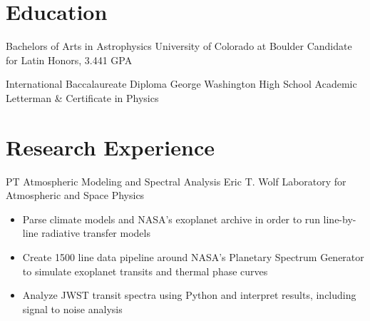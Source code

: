 \documentclass[11pt]{article} %
\begin{document}
\pagebreak[3]
\section{Education} 





     
    {}
    {Bachelors of Arts in Astrophysics} %
    {University of Colorado at Boulder} %
    {Candidate for Latin Honors, 3.441 GPA} %
    {}
    
    
    {}
    {International Baccalaureate Diploma} %
    {George Washington High School} %
    {Academic Letterman \& Certificate in Physics} %
    {}


\pagebreak[3]
\section{Research Experience}

{PT} %
{Atmospheric Modeling and Spectral Analysis} %
{Eric T. Wolf} %
{Laboratory for Atmospheric and Space Physics}
{\begin{itemize}
\setlength\itemsep{0.1em}
\item Parse climate models and NASA's exoplanet archive in order to run line-by-line radiative transfer models
\item Create 1500 line data pipeline around NASA's Planetary Spectrum Generator to simulate exoplanet transits and thermal phase curves
\item Analyze JWST transit spectra using Python and interpret results, including signal to noise analysis
\end{itemize}
}
\end{document}
